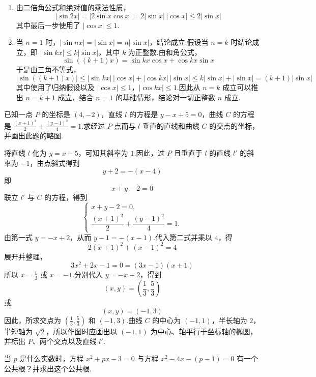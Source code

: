 \documentclass[UTF8,a4paper,oneside,11pt]{ctexbook}
\begin{document}
\begin{solution}
\begin{enumerate}
\item 由二倍角公式和绝对值的乘法性质，
\[
|\sin2x|=|2\sin x\cos x|=2|\sin x|\,|\cos x|\leq2|\sin x|
\]
其中最后一步使用了 \( |\cos x|\leq1 \).

\item 当 \(n=1\) 时，\( |\sin nx|=|\sin x|=n|\sin x| \)，结论成立.假设当 \(n=k\) 时结论成立，即 \( |\sin kx|\leq k|\sin x| \)，其中 \(k\) 为正整数.由和角公式，
\[
\sin((k+1)x)=\sin kx\cos x+\cos kx\sin x
\]
于是由三角不等式，
\[
|\sin((k+1)x)|\leq|\sin kx|\,|\cos x|+|\cos kx|\,|\sin x|\leq k|\sin x|+|\sin x|=(k+1)|\sin x|
\]
其中使用了归纳假设以及 \( |\cos x|\leq1 \)，\( |\cos kx|\leq1 \).因此从 \(n=k\) 成立可以推出 \(n=k+1\) 成立，结合 \(n=1\) 的基础情形，结论对一切正整数 \(n\) 成立.
\end{enumerate}
\end{solution}

\begin{problem}
已知一点 \(P\) 的坐标是 \( (4,-2) \)，直线 \(l\) 的方程是 \(y-x+5=0\)，曲线 \(C\) 的方程是 \(\frac{(x+1)^2}{2}+\frac{(y-1)^2}{4}=1\).求经过 \(P\) 点而与 \(l\) 垂直的直线和曲线 \(C\) 的交点的坐标，并画出此题的略图.
\end{problem}

\begin{solution}
将直线 \(l\) 化为 \(y=x-5\)，可知其斜率为 \(1\).因此，过 \(P\) 且垂直于 \(l\) 的直线 \(l'\) 的斜率为 \(-1\)，由点斜式得到
\[
y+2=-(x-4)
\]
即
\[
x+y-2=0
\]
联立 \(l'\) 与 \(C\) 的方程，得到
\[
\begin{cases}
x+y-2=0,\\
\dfrac{(x+1)^2}{2}+\dfrac{(y-1)^2}{4}=1.
\end{cases}
\]
由第一式 \(y=-x+2\)，从而 \(y-1=-(x-1)\).代入第二式并乘以 \(4\)，得
\[
2(x+1)^2+(x-1)^2=4
\]
展开并整理，
\[
3x^2+2x-1=0=(3x-1)(x+1)
\]
所以 \(x=\frac13\) 或 \(x=-1\).分别代入 \(y=-x+2\)，得到
\[
\left(x,y\right)=\left(\frac13,\frac53\right)
\]
或
\[
\left(x,y\right)=(-1,3)
\]
因此，所求交点为 \(\left(\frac13,\frac53\right)\) 和 \((-1,3)\).曲线 \(C\) 的中心为 \((-1,1)\)，半长轴为 \(2\)，半短轴为 \(\sqrt2\)，所以作图时应画出以 \((-1,1)\) 为中心、轴平行于坐标轴的椭圆，并标出 \(P\)、两个交点以及直线 \(l'\).

\end{solution}

\begin{problem}
当 \(p\) 是什么实数时，方程 \(x^2+px-3=0\) 与方程 \(x^2-4x-(p-1)=0\) 有一个公共根？并求出这个公共根.
\end{problem}
\end{document}
